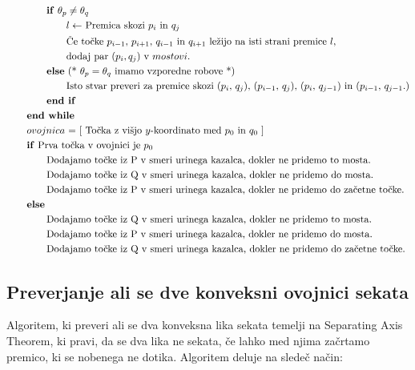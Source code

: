 \documentclass[fleqn]{article}
\begin{document}
\begin{align*}
    &\text{\qquad \qquad \textbf{if} $\theta_p \neq \theta_q$} \\
    &\text{\qquad \qquad \qquad $l \leftarrow$ Premica skozi $p_i$ in $q_j$} \\
    &\text{\qquad \qquad \qquad Če točke $p_{i-1}$, $p_{i+1}$, $q_{i-1}$ in $q_{i+1}$ ležijo na isti strani premice $l$,} \\
    &\text{\qquad \qquad \qquad dodaj par $(p_i, q_j)$ v $mostovi$.} \\
    &\text{\qquad \qquad \textbf{else} (* $\theta_p = \theta_q$ imamo vzporedne robove *)} \\
    &\text{\qquad \qquad \qquad Isto stvar preveri za premice skozi ($p_i$, $q_j$), ($p_{i-1}$, $q_j$), ($p_i$, $q_{j-1}$) in ($p_{i-1}$, $q_{j-1}$.)} \\
    &\text{\qquad \qquad \textbf{end if}} \\
    &\text{\qquad \textbf{end while}} \\
    &\text{\qquad $ovojnica$ = [ Točka z višjo $y$-koordinato med $p_0$ in $q_0$ ]} \\
    &\text{\qquad \textbf{if} Prva točka v ovojnici je $p_0$} \\
    &\text{\qquad \qquad Dodajamo točke iz P v smeri urinega kazalca, dokler ne pridemo to mosta.} \\
    &\text{\qquad \qquad Dodajamo točke iz Q v smeri urinega kazalca, dokler ne pridemo do mosta.} \\
    &\text{\qquad \qquad Dodajamo točke iz P v smeri urinega kazalca, dokler ne pridemo do začetne točke.} \\
    &\text{\qquad \textbf{else}} \\
    &\text{\qquad \qquad Dodajamo točke iz Q v smeri urinega kazalca, dokler ne pridemo to mosta.} \\
    &\text{\qquad \qquad Dodajamo točke iz P v smeri urinega kazalca, dokler ne pridemo do mosta.} \\
    &\text{\qquad \qquad Dodajamo točke iz Q v smeri urinega kazalca, dokler ne pridemo do začetne točke.} \\
\end{align*}

\subsection*{Preverjanje ali se dve konveksni ovojnici sekata}

Algoritem, ki preveri ali se dva konveksna lika sekata temelji na Separating Axis Theorem, ki pravi,
da se dva lika ne sekata, če lahko med njima začrtamo premico, ki se nobenega ne dotika. 
Algoritem deluje na sledeč način:
\end{document}

